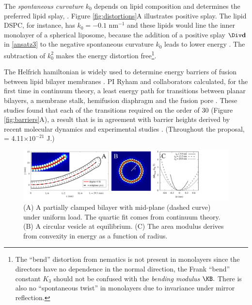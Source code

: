 The \emph{spontaneous curvature} $k_0$ depends on lipid composition and determines the preferred lipid splay,
\cite{RoLi15,Kozlov2007}. 
Figure \ref{fig:distortions}A illustrates positive splay. 
The lipid DSPC, for instance, has $k_0 = -0.1$ nm$^{-1}$ 
and these lipids would line the  inner monolayer of a 
spherical liposome, because the addition of a positive splay $\Div \mathbf{d}$  in \eqref{ansatz3}
to the negative spontaneous curvature $k_0$ leads to lower energy \cite{Kamal22245, C3SM51829A, RoLi15,FriedSeguin15}.
The subtraction of $k_0^2$ makes the energy distortion 
free\footnote{The  ``bend'' distortion from nematics  
is not present in monolayers since the directors have no dependence in the normal direction,  \ie the 
Frank ``bend'' constant $K_3$ should not be confused with the \emph{bending modulus} $\KB.$ 
There is also no ``spontaneous twist'' in monolayers due to invariance under mirror reflection.}. 

The Helfrich hamiltonian is widely used to determine energy barriers of fusion between lipid bilayer membranes \cite{ChKo08}. 
PI Ryham and collaborators calculated, for the first time in continuum theory, a least energy path for transitions between planar bilayers, a membrane stalk, hemifusion diaphragm and the fusion pore  \cite{RyWaCo13, RyKlYaCo16}. 
These studies 
found that each of the transitions required on the order of 30 \kBT\; (Figure \ref{fig:barriers}A),
a result that is in agreement with barrier heights derived by recent molecular dynamics and experimental studies
\cite{FrRoPi17}.  
(Throughout the proposal, \kBT\; = 4.11$\times 10^{-21}$ J.)



\begin{figure}
\begin{center}
\includegraphics[width=\textwidth]{figures/SA1_fig2.pdf}
\end{center}\vspace{-1.em}
\caption{\footnotesize (A) A partially clamped bilayer with mid-plane (dashed curve) under uniform load.
The quartic fit comes from continuum theory. 
(B) A circular vesicle at equilibrium. (C) The area modulus derives
from convexity in energy as a function of radius. 
\label{fig:bend}}
\end{figure}

